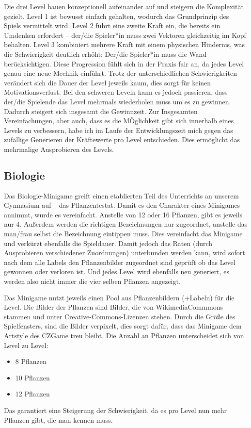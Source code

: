 Die drei Level bauen konzeptionell aufeinander auf und steigern die Komplexität gezielt. Level 1 ist bewusst einfach gehalten, wodurch das Grundprinzip des Spiels vermittelt wird. Level 2 führt eine zweite Kraft ein, die bereits ein Umdenken erfordert – der/die Spieler*in muss zwei Vektoren gleichzeitig im Kopf behalten. Level 3 kombiniert mehrere Kraft mit einem physischen Hindernis, was die Schwierigkeit deutlich erhöht: Der/die Spieler*in muss die Wand berücksichtigen. Diese Progression fühlt sich in der Praxis fair an, da jedes Level genau eine neue Mechnik einführt. Trotz der unterschiedlichen Schwierigkeiten verändert sich die Dauer der Level jeweils kaum, dies sorgt für keinen Motivationsverlust.
Bei den schweren Leveln kann es jedoch passieren, dass der/die Spielende das Level mehrmals wiederholen muss um es zu gewinnen. Dadurch steigert sich insgesamt die Gewinnzeit.
Zur Insgesamten Vereinfachungen, aber auch, dass es die MÖglichkeit gibt sich innerhalb eines Levels zu verbessern, habe ich im Laufe der Entwicklungszeit mich gegen das zufällige Generieren der Kräftewerte pro Level entschieden. Dies ermöglicht das mehrmalige Ausprobieren des Levels.

\subsection{Biologie}
Das Biologie-Minigame greift einen etablierten Teil des Unterrichts an unserem Gymnasium auf – das Pflanzentestat.
Damit es den Charakter eines Minigames annimmt, wurde es vereinfacht. Anstelle von 12 oder 16 Pflanzen, gibt es jeweils nur 4. Außerdem werden die richtigen Bezeichnungen nur zugeordnet, anstelle das man/frau selbst die Bezeichnung eintippen muss. Dies vereinfacht das Minigame und verkürzt ebenfalls die Spieldauer.
Damit jedoch das Raten (durch Ausprobieren verschiedener Zuordnungen) unterbunden werden kann, wird sofort nach dem alle Labels den Pflanzenbilder zugeordnet sind geprüft ob das Level gewonnen oder verloren ist. Und jedes Level wird ebenfalls neu generiert, es werden also nicht immer die vier selben Pflanzen angezeigt.

Das Minigame nutzt jeweils einen Pool aus Pflanzenbildern (+Labeln) für die Level. Die Bilder der Pflanzen sind Bilder, die von WikimediaCommmons stammen und unter Creative-Commons-Lizenzen stehen.
Durch die Größe des Spielfensters, sind die Bilder verpixelt, dies sorgt dafür, dass das Minigame dem Artstyle des CZGame treu bleibt.
Die Anzahl an Pflanzen unterscheidet sich von Level zu Level:
\begin{itemize}
\item[\textbf{Level 1}] 8 Pflanzen
\item[\textbf{Level 2}] 10 Pflanzen
\item[\textbf{Level 3}] 12 Pflanzen
\end{itemize}
Das garantiert eine Steigerung der Schwierigkeit, da es pro Level nun mehr Pflanzen gibt, die man kennen muss.

